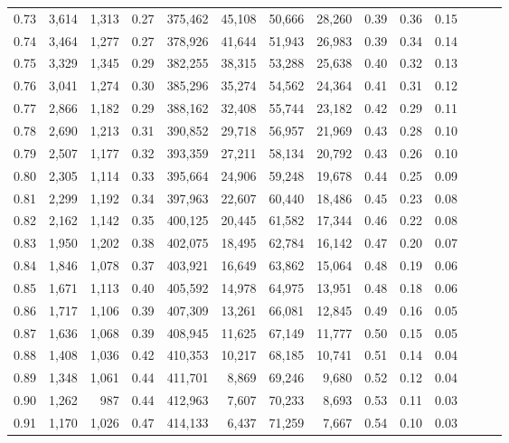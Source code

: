 \begin{tabular}{rrrrrrrrrrrrrr}
0.73 &  3,614 &  1,313 &  0.27 &  375,462 &   45,108 &  50,666 &  28,260 &  0.39 &  0.36 &      0.15 \\
0.74 &  3,464 &  1,277 &  0.27 &  378,926 &   41,644 &  51,943 &  26,983 &  0.39 &  0.34 &      0.14 \\
0.75 &  3,329 &  1,345 &  0.29 &  382,255 &   38,315 &  53,288 &  25,638 &  0.40 &  0.32 &      0.13 \\
0.76 &  3,041 &  1,274 &  0.30 &  385,296 &   35,274 &  54,562 &  24,364 &  0.41 &  0.31 &      0.12 \\
0.77 &  2,866 &  1,182 &  0.29 &  388,162 &   32,408 &  55,744 &  23,182 &  0.42 &  0.29 &      0.11 \\
0.78 &  2,690 &  1,213 &  0.31 &  390,852 &   29,718 &  56,957 &  21,969 &  0.43 &  0.28 &      0.10 \\
0.79 &  2,507 &  1,177 &  0.32 &  393,359 &   27,211 &  58,134 &  20,792 &  0.43 &  0.26 &      0.10 \\
0.80 &  2,305 &  1,114 &  0.33 &  395,664 &   24,906 &  59,248 &  19,678 &  0.44 &  0.25 &      0.09 \\
0.81 &  2,299 &  1,192 &  0.34 &  397,963 &   22,607 &  60,440 &  18,486 &  0.45 &  0.23 &      0.08 \\
0.82 &  2,162 &  1,142 &  0.35 &  400,125 &   20,445 &  61,582 &  17,344 &  0.46 &  0.22 &      0.08 \\
0.83 &  1,950 &  1,202 &  0.38 &  402,075 &   18,495 &  62,784 &  16,142 &  0.47 &  0.20 &      0.07 \\
0.84 &  1,846 &  1,078 &  0.37 &  403,921 &   16,649 &  63,862 &  15,064 &  0.48 &  0.19 &      0.06 \\
0.85 &  1,671 &  1,113 &  0.40 &  405,592 &   14,978 &  64,975 &  13,951 &  0.48 &  0.18 &      0.06 \\
0.86 &  1,717 &  1,106 &  0.39 &  407,309 &   13,261 &  66,081 &  12,845 &  0.49 &  0.16 &      0.05 \\
0.87 &  1,636 &  1,068 &  0.39 &  408,945 &   11,625 &  67,149 &  11,777 &  0.50 &  0.15 &      0.05 \\
0.88 &  1,408 &  1,036 &  0.42 &  410,353 &   10,217 &  68,185 &  10,741 &  0.51 &  0.14 &      0.04 \\
0.89 &  1,348 &  1,061 &  0.44 &  411,701 &    8,869 &  69,246 &   9,680 &  0.52 &  0.12 &      0.04 \\
0.90 &  1,262 &    987 &  0.44 &  412,963 &    7,607 &  70,233 &   8,693 &  0.53 &  0.11 &      0.03 \\
0.91 &  1,170 &  1,026 &  0.47 &  414,133 &    6,437 &  71,259 &   7,667 &  0.54 &  0.10 &      0.03 \\

\end{tabular}
